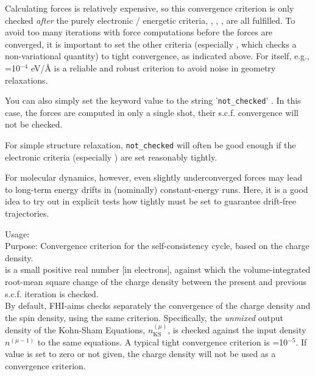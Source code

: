 Calculating forces is relatively expensive, so this convergence
criterion is only checked \emph{after} the purely electronic /
energetic criteria, ,
, , are all
fulfilled. To avoid too many iterations with force computations before
the forces are converged, it is important to set the other criteria
(especially , which checks a
non-variational quantity) to tight convergence, as indicated
above. For  itself, e.g.,
=10$^{-4}$ eV/{\AA} is a reliable and robust criterion
to avoid noise in geometry relaxations.

You can also simply set the keyword value to the string
'\texttt{not\_checked}' . In this case, the forces are computed in only
a single shot, their s.c.f. convergence will not be checked. 

For simple structure relaxation, \texttt{not\_checked} will often be
good enough if the electronic criteria (especially
) are set reasonably tightly. 

For molecular
dynamics, however, even slightly underconverged forces may lead to
long-term energy drifts in (nominally) constant-energy runs. Here, it
is a good idea to try out in explicit tests how tightly
 must be set to guarantee drift-free
trajectories. 

{
  \noindent
  Usage:   \\[1.0ex]
  Purpose: Convergence criterion for the self-consistency cycle, based
    on the charge density. \\[1.0ex]
   is a small positive real number [in electrons],
  against which the volume-integrated root-mean square change of the
  charge density between the present and previous s.c.f. iteration is 
  checked. \\ 
}
By default, FHI-aims checks separately the convergence of the charge
density and the spin density, using the same criterion. Specifically,
the \emph{unmixed} output density of the Kohn-Sham Equations,
$n_\text{KS}^{(\mu)}$, is checked against the input density
  $n^{(\mu-1)}$ to the same equations. A typical tight convergence
  criterion is =10$^{-5}$. If value is set 
to zero or not given, the charge density will not be used as a
convergence criterion. 

